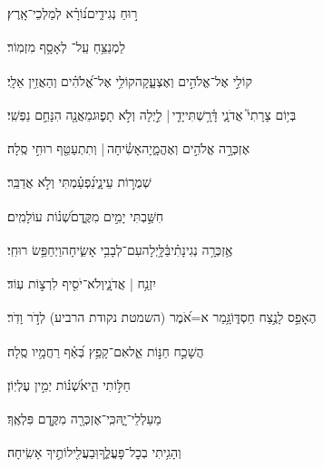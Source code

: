 \documentclass[12pt]{article}
\newcommand{\loc}[1]{\textsuperscript{\locf{#1}}}
\begin{document}
{\loc{ יג}~}‏ ר֣וּחַ נְגִידִ֑ים{\hfill}נ֝וֹרָ֗א לְמַלְכֵי־אָֽרֶץ׃\par\pend
\ledpb
\pstart[\subsection*{\textcolor{red}{פרק עז}}]\label{פרק עז}
{\loc{ א}~}‏לַמְנַצֵּ֥חַ עַֽל־ לְאָסָ֥ף מִזְמֽוֹר׃\par

{\loc{ ב}~}‏קוֹלִ֣י אֶל־אֱלֹהִ֣ים וְאֶצְעָ֑קָה{\hfill}קוֹלִ֥י אֶל־אֱ֝לֹהִ֗ים וְהַאֲזִ֥ין אֵלָֽי׃\par

{\loc{ ג}~}‏בְּי֥וֹם צָרָתִי֮ אֲדֹנָ֢י דָּ֫רָ֥שְׁתִּי{\hfill}יָדִ֤י |  לַ֣יְלָה \newline\hspace*{.5em}וְלֹ֣א תָפ֑וּג{\hfill}מֵאֲנָ֖ה הִנָּחֵ֣ם נַפְשִֽׁי׃\par

{\loc{ ד}~}‏אֶזְכְּרָ֣ה אֱלֹהִ֣ים וְאֶהֱמָ֑יָה{\hfill}אָשִׂ֓יחָה |  וְתִתְעַטֵּ֖ף רוּחִ֣י סֶֽלָה׃\par

{\loc{ ה}~}‏ שְׁמֻר֣וֹת עֵינָ֑י{\hfill}נִ֝פְעַ֗מְתִּי וְלֹ֣א אֲדַבֵּֽר׃\par

{\loc{ ו}~}‏חִשַּׁ֣בְתִּי יָמִ֣ים מִקֶּ֑דֶם{\hfill}שְׁ֝נ֗וֹת עוֹלָמִֽים׃\par

{\loc{ ז}~}‏אֶ֥זְכְּרָ֥ה נְגִינָתִ֗י{\hfill}בַּ֫לָּ֥יְלָה\newline\hspace*{.5em}עִם־לְבָבִ֥י אָשִׂ֑יחָה{\hfill}וַיְחַפֵּ֥שׂ רוּחִֽי׃\par

{\loc{ ח}~}‏ יִזְנַ֥ח | אֲדֹנָ֑י{\hfill}וְלֹא־יֹסִ֖יף לִרְצ֣וֹת עֽוֹד׃\par

{\loc{ ט}~}‏הֶאָפֵ֣ס לָנֶ֣צַח חַסְדּ֑וֹ{\hfill}גָּ֥מַר א=אֹ֝מֶר (השמטת נקודת הרביע) לְדֹ֣ר וָדֹֽר׃\par

{\loc{ י}~}‏הֲשָׁכַ֣ח חַנּ֣וֹת אֵ֑ל{\hfill}אִם־קָפַ֥ץ בְּ֝אַ֗ף רַחֲמָ֥יו סֶֽלָה׃\par

{\loc{ יא}~}‏ חַלּ֣וֹתִי הִ֑יא{\hfill}שְׁ֝נ֗וֹת יְמִ֣ין עֶלְיֽוֹן׃\par

{\loc{ יב}~}‏ מַעַלְלֵי־יָ֑הּ{\hfill}כִּֽי־אֶזְכְּרָ֖ה מִקֶּ֣דֶם פִּלְאֶֽךָ׃\par

{\loc{ יג}~}‏וְהָגִ֥יתִי בְכׇל־פָּעֳלֶ֑ךָ{\hfill}וּֽבַעֲלִ֖ילוֹתֶ֣יךָ אָשִֽׂיחָה׃\par
\end{document}

